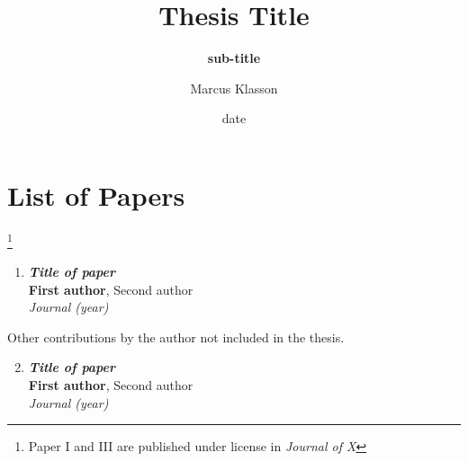 \documentclass[electronic]{kthesis}
\begin{document}
	
	\title{ Thesis Title }
	\subtitle{\textbf{sub-title}}
	\author{Marcus Klasson}
	\date{date}
	\address{KTH Royal Institute of Technology \\School of Electrical Engineering and Computer Science\\ Division of Fusion Plasma Physics \\ SE-10044 Stockholm\\ Sweden}
	
	\maketitle
	
	\frontmatter %
	
	
	\newpage
	
	
	\chapter{List of Papers}
	
	\let\thefootnote\relax\footnote{Paper I and III are published under license in \textit{Journal of X}}
	\begin{enumerate}[I]
		\item \textbf{\textit{Title of paper}} \\
		\textbf{First author}, Second author \\
		\textit{Journal (year)}
	\end{enumerate}
	
	Other contributions by the author not included in the thesis.
	\begin{enumerate}[I]
		\setcounter{enumi}{1}
		\item \textbf{\textit{Title of paper}} \\
		\textbf{First author}, Second author \\
		\textit{Journal (year)}
	\end{enumerate}
\end{document}
